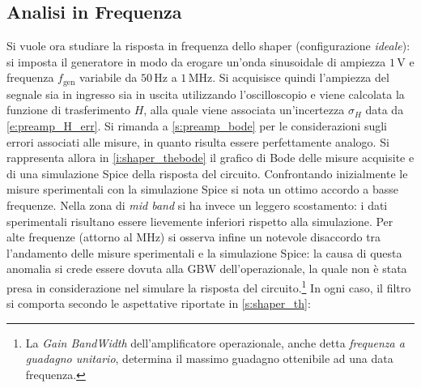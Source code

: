 \documentclass[a4paper,11pt]{article} %
\begin{document}

\subsection{Analisi in Frequenza}\label{s:shaper_bode}

Si vuole ora studiare la risposta in frequenza dello shaper (configurazione \textit{ideale}): si imposta il generatore
in modo da erogare un'onda sinusoidale di ampiezza $1\,\si{\volt}$ e frequenza $f_{\text{gen}}$ variabile da
$50\,\si{\Hz}$ a $1\,\si{\MHz}$. Si acquisisce quindi l'ampiezza del segnale sia in ingresso sia in uscita utilizzando
l'oscilloscopio e viene calcolata la funzione di trasferimento $H$, alla quale viene associata un'incertezza
$\sigma_{H}$ data da \autoref{e:preamp_H_err}. Si rimanda a \autoref{s:preamp_bode} per le considerazioni sugli errori
associati alle misure, in quanto risulta essere perfettamente analogo. Si rappresenta allora in
\autoref{i:shaper_thebode} il grafico di Bode delle misure acquisite e di una simulazione Spice della risposta del
circuito. Confrontando inizialmente le misure sperimentali con la simulazione Spice si nota un ottimo accordo a basse
frequenze. Nella zona di \textit{mid band} si ha invece un leggero scostamento: i dati sperimentali risultano essere
lievemente inferiori rispetto alla simulazione. Per alte frequenze (attorno al MHz) si osserva infine un notevole
disaccordo tra l'andamento delle misure sperimentali e la simulazione Spice: la causa di questa anomalia si crede essere
dovuta alla GBW dell'operazionale, la quale non è stata presa in considerazione nel simulare la risposta del
circuito.\footnote{La \textit{Gain BandWidth} dell'amplificatore operazionale, anche detta \textit{frequenza a guadagno
unitario}, determina il massimo guadagno ottenibile ad una data frequenza.} In ogni caso, il filtro si comporta secondo
le aspettative riportate in \autoref{s:shaper_th}:
\end{document}
